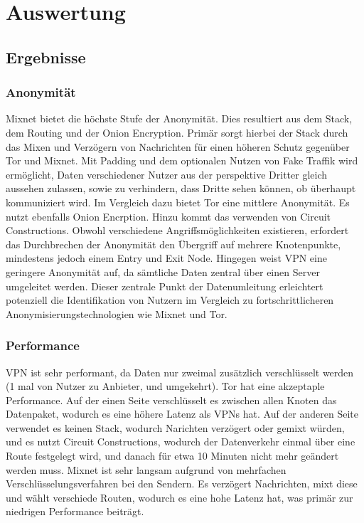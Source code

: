 \section{Auswertung}

\subsection{Ergebnisse}

\subsubsection{Anonymität}

Mixnet bietet die höchste Stufe der Anonymität. Dies resultiert aus dem Stack, dem Routing und der Onion Encryption. Primär sorgt hierbei der Stack durch das Mixen und Verzögern von Nachrichten für einen höheren Schutz gegenüber Tor und Mixnet. Mit Padding und dem optionalen Nutzen von Fake Traffik wird ermöglicht, Daten verschiedener Nutzer aus der perspektive Dritter gleich aussehen zulassen, sowie zu verhindern, dass Dritte sehen können, ob überhaupt kommuniziert wird.
Im Vergleich dazu bietet Tor eine mittlere Anonymität. Es nutzt ebenfalls Onion Encrption. Hinzu kommt das verwenden von Circuit Constructions. Obwohl verschiedene Angriffsmöglichkeiten existieren, erfordert das Durchbrechen der Anonymität den Übergriff auf mehrere Knotenpunkte, mindestens jedoch einem Entry und Exit Node.
Hingegen weist VPN eine geringere Anonymität auf, da sämtliche Daten zentral über einen Server umgeleitet werden. Dieser zentrale Punkt der Datenumleitung erleichtert potenziell die Identifikation von Nutzern im Vergleich zu fortschrittlicheren Anonymisierungstechnologien wie Mixnet und Tor.

\subsubsection{Performance}

VPN ist sehr performant, da Daten nur zweimal zusätzlich verschlüsselt werden (1 mal von Nutzer zu Anbieter, und umgekehrt).
Tor hat eine akzeptaple Performance. Auf der einen Seite verschlüsselt es zwischen allen Knoten das Datenpaket, wodurch es eine höhere Latenz als VPNs hat. Auf der anderen Seite verwendet es keinen Stack, wodurch Narichten verzögert oder gemixt würden, und es nutzt Circuit Constructions, wodurch der Datenverkehr einmal über eine Route festgelegt wird, und danach für etwa 10 Minuten nicht mehr geändert werden muss.
Mixnet ist sehr langsam aufgrund von mehrfachen Verschlüsselungsverfahren bei den Sendern. Es verzögert Nachrichten, mixt diese und wählt verschiede Routen, wodurch es eine hohe Latenz hat, was primär zur niedrigen Performance beiträgt.


